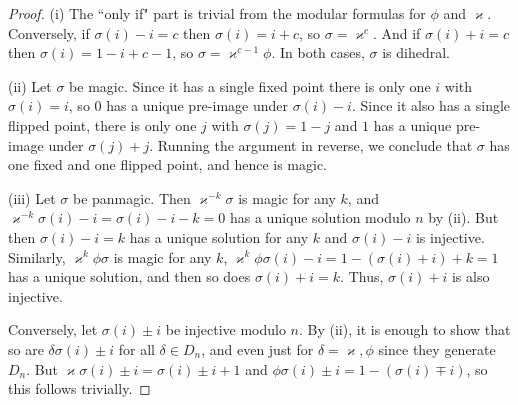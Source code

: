 \documentclass[10pt,a4paper]{amsart}
\def\k{{\varkappa}}
\def\s{{\sigma}}
\begin{document}
\begin{proof}\phantom{a} 

\noindent(i) The ``only if" part is trivial from the modular formulas for $\phi$ and $\k$. Conversely, if $\s(i)-i=c$ then $\s(i)=i+c$, so $\s=\k^c$. And if $\s(i)+i=c$ then $\s(i)=1-i+c-1$, so $\s=\k^{c-1}\phi$. In both cases, $\s$ is dihedral.
\smallskip

\noindent(ii) Let $\s$ be magic. Since it has a single fixed point there is only one $i$ with $\s(i)=i$, so $0$ has a unique pre-image under $\s(i)-i$. Since it also has a single flipped point, there is only one $j$ with $\s(j)=1-j$ and $1$ has a unique pre-image under $\s(j)+j$. Running the argument in reverse, we conclude that $\s$ has one fixed and one flipped point, and hence is magic. 
\medskip

\noindent(iii) Let $\s$ be panmagic. Then $\k^{-k}\s$ is magic for any $k$, and $\k^{-k}\s(i)-i=\s(i)-i-k=0$ has a unique solution modulo $n$ by (ii). But then $\s(i)-i=k$ has a unique solution for any $k$ and $\s(i)-i$ is injective. Similarly, $\k^{k}\phi\s$ is magic for any $k$, $\k^{k}\phi\s(i)-i=1-(\s(i)+i)+k=1$ has a unique solution, and then so does $\s(i)+i=k$. Thus, $\s(i)+i$ is also injective. 

Conversely, let $\sigma(i)\pm i$ be injective modulo $n$. By (ii), it is enough to show that so are $\delta\s(i)\pm i$ for all $\delta\in D_n$, and even just for $\delta=\k,\phi$ since they generate $D_n$. But $\k\s(i)\pm i=\sigma(i)\pm i+1$ and $\phi\s(i)\pm i=1-(\sigma(i)\mp i)$, so this follows trivially.
\end{proof}
\end{document}
